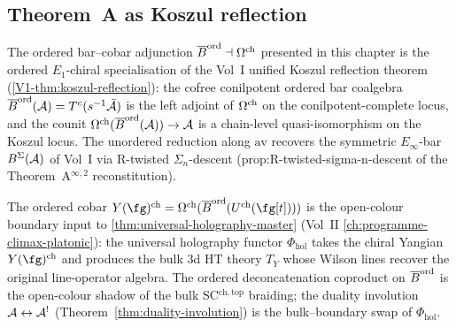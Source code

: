 \subsection{Theorem~A as Koszul reflection}
\label{subsec:ordered-kd-core-koszul-reflection-anchor}

\begin{remark}
\label{rem:ordered-kd-core-koszul-reflection}
The ordered bar--cobar adjunction
$\overline{B}^{\mathrm{ord}} \dashv \Omega^{\mathrm{ch}}$ presented in this chapter is the
ordered $E_1$-chiral specialisation of the Vol~I unified
Koszul reflection theorem
(\cref{V1-thm:koszul-reflection}): the cofree conilpotent
ordered bar coalgebra $\overline{B}^{\mathrm{ord}}(\mathcal{A}) = T^c(s^{-1}\bar{\mathcal{A}})$ is the
left adjoint of $\Omega^{\mathrm{ch}}$ on the conilpotent-complete locus, and
the counit $\Omega^{\mathrm{ch}}(\overline{B}^{\mathrm{ord}}(\mathcal{A})) \to \mathcal{A}$ is a chain-level
quasi-isomorphism on the Koszul locus. The unordered reduction
along $\mathrm{av}$ recovers the symmetric $E_\infty$-bar
$B^\Sigma(\mathcal{A})$ of Vol~I via R-twisted $\Sigma_n$-descent
(prop:R-twisted-sigma-n-descent of the Theorem~A$^{\infty,2}$
reconstitution).
\end{remark}

\begin{remark}
\label{rem:ordered-kd-core-uhm-bridge}
The ordered cobar $Y(\fg)^{\mathrm{ch}} =
\Cobar(\Barchord(U^{\mathrm{ch}}(\fg[t])))$ is the open-colour
boundary input to
\cref{thm:universal-holography-master} (Vol~II
\cref{ch:programme-climax-platonic}): the universal holography functor
$\Phi_{\mathrm{hol}}$ takes the chiral Yangian $Y(\fg)^{\mathrm{ch}}$
and produces the bulk $3$d HT theory $T_Y$ whose Wilson lines
recover the original line-operator algebra. The ordered
deconcatenation coproduct on $\overline{B}^{\mathrm{ord}}$ is the open-colour
shadow of the bulk SC$^{\mathrm{ch,top}}$ braiding; the duality
involution $\mathcal{A} \leftrightarrow \mathcal{A}^!$
(Theorem~\ref{thm:duality-involution}) is the bulk--boundary swap
of $\Phi_{\mathrm{hol}}$.
\end{remark}

